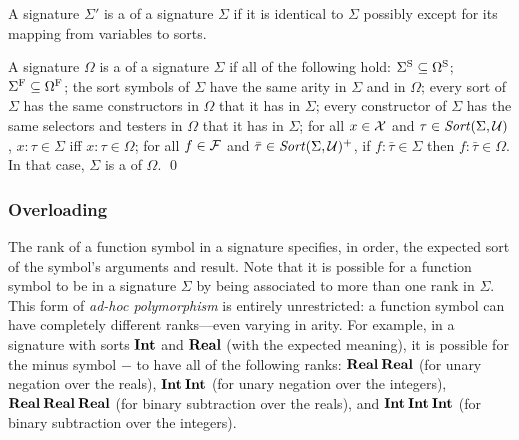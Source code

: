 \begin{definition} 
A signature $\Sigma'$ is a  of a signature $\Sigma$ 
if it is identical to $\Sigma$ possibly except for its mapping 
from variables to sorts.

A signature $\Omega$ is a  of a signature $\Sigma$
if all of the following hold:
$\Sigma^\mathrm{S} \subseteq \Omega^\mathrm{S}$;
$\Sigma^\mathrm{F} \subseteq \Omega^\mathrm{F}$;
the sort symbols of $\Sigma$ have the same arity in $\Sigma$ and in $\Omega$;
every sort of $\Sigma$ has the same constructors in $\Omega$ that it has in $\Sigma$;
every constructor of $\Sigma$ has the same selectors and testers in $\Omega$ 
that it has in $\Sigma$;
for all $x \in \mathcal{X}$ and $\tau \in \mathit{Sort}(\Sigma, \mathcal{U})$,
$x{:}\tau \in \Sigma$ iff $x{:}\tau \in \Omega$;
for all $f \in \mathcal{F}$ and $\bar{\tau} \in \mathit{Sort}(\Sigma, \mathcal{U})^+$,
if $f{:}\bar{\tau} \in \Sigma$ then $f{:}\bar{\tau} \in \Omega$.
In that case, $\Sigma$ is a  of $\Omega$.
\qed
\end{definition}


\subsubsection{Overloading}
The rank of a function symbol in a signature specifies, in order,
the expected sort of the symbol's arguments and result.
Note that it is possible for a function symbol
to be  in a signature $\Sigma$
by being associated to more than one rank in $\Sigma$.
This form of \emph{ad-hoc polymorphism} is entirely unrestricted: 
a function symbol can have completely different ranks---even varying in arity. 
For example,
in a signature with sorts $\textbf{Int}$ and $\textbf{Real}$ (with the expected meaning),
it is possible for the minus symbol $-$ to have all of the following ranks:  
$\textbf{Real}\:\textbf{Real}$ (for unary negation over the reals),
$\textbf{Int}\:\textbf{Int}$ (for unary negation over the integers),
$\textbf{Real}\:\textbf{Real}\:\textbf{Real}$ (for binary subtraction over the reals),
and
$\textbf{Int}\:\textbf{Int}\:\textbf{Int}$ (for binary subtraction over the integers).

